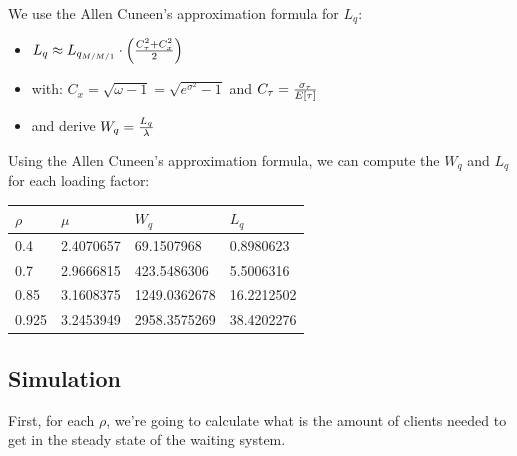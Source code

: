 \documentclass[]{article}
\providecommand{\tightlist}{%
  \setlength{\itemsep}{0pt}\setlength{\parskip}{0pt}}
\begin{document}
We use the Allen Cuneen's approximation formula for \(L_{q}\):

\begin{itemize}
\tightlist
\item
  \(L_{q} \approx L_{q_{M/M/1}} \cdot \left( C_{\tau}^{2} + C_{x}^{2} \over 2 \right)\)
\item
  with: \(C_{x} = \sqrt{ \omega - 1} = \sqrt{ e^{\sigma^{2}} - 1}\) and
  \(C_{\tau} = { \sigma_{\tau} \over E[\tau] }\)
\item
  and derive \(W_{q} = { L_{q} \over \lambda }\)
\end{itemize}

Using the Allen Cuneen's approximation formula, we can compute the
\(W_{q}\) and \(L_{q}\) for each loading factor:

\begin{longtable}[]{@{}llll@{}}
\toprule
\(\rho\) & \(\mu\) & \(W_{q}\) & \(L_{q}\)\tabularnewline
\midrule
\endhead
0.4 & 2.4070657 & 69.1507968 & 0.8980623\tabularnewline
0.7 & 2.9666815 & 423.5486306 & 5.5006316\tabularnewline
0.85 & 3.1608375 & 1249.0362678 & 16.2212502\tabularnewline
0.925 & 3.2453949 & 2958.3575269 & 38.4202276\tabularnewline
\bottomrule
\end{longtable}

\subsection{Simulation}\label{simulation}

First, for each \(\rho\), we're going to calculate what is the amount of
clients needed to get in the steady state of the waiting system.
\end{document}
